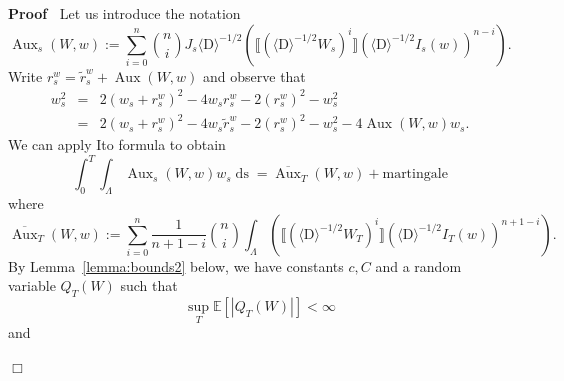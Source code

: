 \documentclass[11pt]{article}
\newcommand{\assign}{:=}
\newcommand{\mathD}{\mathrm{D}}
\newcommand{\tmop}[1]{\ensuremath{\operatorname{#1}}}
\newenvironment{proof}{\noindent\textbf{Proof\ }}{\hspace*{\fill}$\Box$\medskip}
\begin{document}
\begin{proof}
  Let us introduce the notation
  \[ \tmop{Aux}_s (W, w) \assign \sum_{i = 0}^n \binom{n}{i} J_s \langle
     \mathD \rangle^{- 1 / 2} (\llbracket (\langle \mathD \rangle^{- 1 / 2}
     W_s)^i \rrbracket (\langle \mathD \rangle^{- 1 / 2} I_s (w))^{n - i})
     . \]
  Write $r_s^w = \tilde{r}_s^w + \tmop{Aux} (W, w)$ and observe that
  \begin{eqnarray*}
    w^2_s & = & 2 (w_s + r_s^w)^2 - 4 w_s r_s^w - 2 (r_s^w)^2 - w^2_s\\
    & = & 2 (w_s + r_s^w)^2 - 4 w_s \tilde{r}_s^w - 2 (r_s^w)^2 - w^2_s - 4
    \tmop{Aux} (W, w) w_s .
  \end{eqnarray*}
  We can apply Ito formula to obtain
  \[ \int^T_0 \int_{\Lambda} \tmop{Aux}_s (W, w) w_s \tmop{ds} =
     \overline{\tmop{Aux}}_T (W, w) + \text{martingale} \]
  where
  \[ \overline{\tmop{Aux}}_T (W, w) \assign \sum_{i = 0}^n \frac{1}{n + 1 - i}
     \binom{n}{i} \int_{\Lambda} (\llbracket (\langle \mathD \rangle^{- 1 / 2}
     W_T)^i \rrbracket (\langle \mathD \rangle^{- 1 / 2} I_T (w))^{n + 1 -
     i}) . \]
  By Lemma~\ref{lemma:bounds2} below, we have constants $c, C$ and a random
  variable $Q_T (W)$ such that
  \[ \sup_T \mathbb{E} [| Q_T (W) |] < \infty \]
  and
  

\end{proof}
\end{document}
